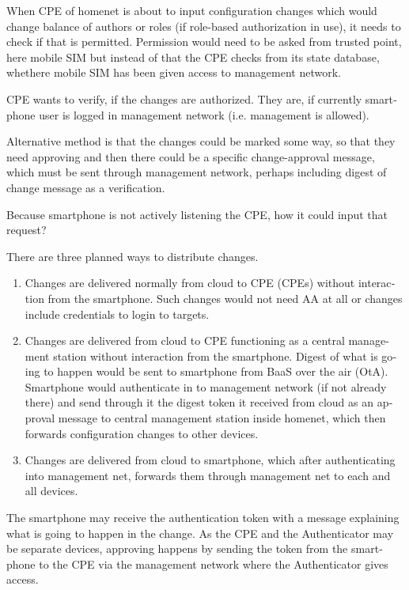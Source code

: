 \documentclass[12pt,a4paper,english]{tutthesis}
\begin{document}
\begin{otherlanguage}{english}
When CPE of homenet is about to input configuration changes which
would change balance of authors or roles (if role-based authorization
in use), it needs to check if that is permitted.  Permission would 
need to be asked from trusted point, here mobile SIM but instead of
that the CPE checks from its state database, 
whethere mobile SIM has been given access to management network.


CPE wants to verify, if the changes are authorized. They are, if currently
smartphone user is logged in management network (i.e. management is allowed).



Alternative method is that the changes could be marked some way, so that they need
approving and then there could be a specific change-approval message,
which must be sent through management network, perhaps including digest
of change message as a verification.

Because smartphone is not actively listening the CPE, how it could
input that request? 

There are three planned ways to distribute changes.

\begin{enumerate}
\item Changes are delivered normally from cloud to CPE (CPEs) without
interaction from the smartphone. Such changes would not need
AA at all or changes include credentials to login to targets.

\item Changes are delivered from cloud to CPE functioning as a central
management station without interaction from the smartphone.  Digest
of what is going to happen would be sent to smartphone from BaaS
over the air (OtA). Smartphone would authenticate in to management
network (if not already there) and send through it the digest token
it received from cloud as an approval message to central management
station inside homenet, which then forwards configuration changes
to other devices.

\item Changes are delivered from cloud to smartphone, which after
authenticating into management net, forwards them through management
net to each and all devices.
\end{enumerate}


The smartphone may receive the authentication token with 
a message explaining what is going to happen in the change.
As the CPE and the Authenticator may be separate devices, approving
happens by sending the token from the smartphone to the CPE via the
management network where the Authenticator gives access.


\end{otherlanguage}
\end{document}
